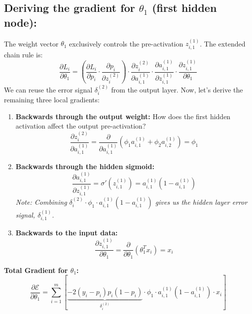 \documentclass[twoside, 10pt]{article}
\begin{document}
\subsection{Deriving the gradient for \texorpdfstring{$\theta_1$}{theta1} (first hidden node):}
The weight vector $\theta_1$ exclusively controls the pre-activation $z_{i,1}^{(1)}$. The extended chain rule is:
\begin{equation}
    \frac{\partial L_i}{\partial \theta_1} = \left( \frac{\partial L_i}{\partial p_i} \cdot \frac{\partial p_i}{\partial z_i^{(2)}} \right) \cdot \frac{\partial z_i^{(2)}}{\partial a_{i,1}^{(1)}} \cdot \frac{\partial a_{i,1}^{(1)}}{\partial z_{i,1}^{(1)}} \cdot \frac{\partial z_{i,1}^{(1)}}{\partial \theta_1}
\end{equation}
We can reuse the error signal $\delta_i^{(2)}$ from the output layer. Now, let's derive the remaining three local gradients:
\begin{enumerate}
    \item \textbf{Backwards through the output weight:} How does the first hidden activation affect the output pre-activation?
    \[ \frac{\partial z_i^{(2)}}{\partial a_{i,1}^{(1)}} = \frac{\partial}{\partial a_{i,1}^{(1)}} (\phi_1 a_{i,1}^{(1)} + \phi_2 a_{i,2}^{(1)}) = \phi_1 \]
    \item \textbf{Backwards through the hidden sigmoid:}
    \[ \frac{\partial a_{i,1}^{(1)}}{\partial z_{i,1}^{(1)}} = \sigma'(z_{i,1}^{(1)}) = a_{i,1}^{(1)}(1 - a_{i,1}^{(1)}) \]
    \textit{Note: Combining $\delta_i^{(2)} \cdot \phi_1 \cdot a_{i,1}^{(1)}(1 - a_{i,1}^{(1)})$ gives us the hidden layer error signal, $\delta_{i,1}^{(1)}$.}
    \item \textbf{Backwards to the input data:}
    \[ \frac{\partial z_{i,1}^{(1)}}{\partial \theta_1} = \frac{\partial}{\partial \theta_1} (\theta_1^T x_i) = x_i \]
\end{enumerate}
\textbf{Total Gradient for $\theta_1$:}
\begin{equation}
    \frac{\partial \mathcal{E}}{\partial \theta_1} = \sum_{i=1}^m \left[ \underbrace{-2(y_i - p_i) p_i(1 - p_i)}_{\delta_i^{(2)}} \cdot \phi_1 \cdot a_{i,1}^{(1)}(1 - a_{i,1}^{(1)}) \cdot x_i \right]
\end{equation}
\end{document}
